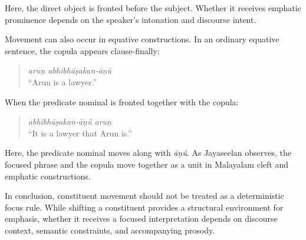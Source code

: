 Here, the direct object is fronted before the subject. Whether it receives emphatic prominence depends on the speaker's intonation and discourse intent.

Movement can also occur in equative constructions. In an ordinary equative sentence, the copula appears clause-finally:

\begin{quote}
\textit{aruṇ abhibhāṣakan-āṇŭ}\\
``Arun is a lawyer.''
\end{quote}

When the predicate nominal is fronted together with the copula:

\begin{quote}
\textit{abhibhāṣakan-āṇŭ aruṇ}\\
``It is a lawyer that Arun is.''
\end{quote}

Here, the predicate nominal moves along with \textit{āṇŭ}. As Jayaseelan \citep{jayaseelan2023dravidian} observes, the focused phrase and the copula move together as a unit in Malayalam cleft and emphatic constructions.

In conclusion, constituent movement should not be treated as a deterministic focus rule. While shifting a constituent provides a structural environment for emphasis, whether it receives a focused interpretation depends on discourse context, semantic constraints, and accompanying prosody.

